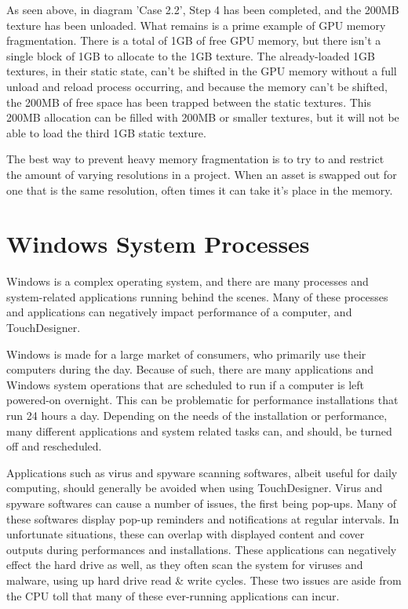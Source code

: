 \begin{fullwidth}
As seen above, in diagram 'Case 2.2', Step 4 has been completed, and the 200MB texture has been unloaded. What remains is a prime example of GPU memory fragmentation. There is a total of 1GB of free GPU memory, but there isn't a single block of 1GB to allocate to the 1GB texture. The already-loaded 1GB textures, in their static state, can't be shifted in the GPU memory without a full unload and reload process occurring, and because the memory can't be shifted, the 200MB of free space has been trapped between the static textures. This 200MB allocation can be filled with 200MB or smaller textures, but it will not be able to load the third 1GB static texture.

The best way to prevent heavy memory fragmentation is to try to and restrict the amount of varying resolutions in a project. When an asset is swapped out for one that is the same resolution, often times it can take it's place in the memory.

\end{fullwidth}


\section{Windows System Processes}

\begin{fullwidth}
Windows is a complex operating system, and there are many processes and system-related applications running behind the scenes. Many of these processes and applications can negatively impact performance of a computer, and TouchDesigner. 

Windows is made for a large market of consumers, who primarily use their computers during the day. Because of such, there are many applications and Windows system operations that are scheduled to run if a computer is left powered-on overnight. This can be problematic for performance installations that run 24 hours a day. Depending on the needs of the installation or performance, many different applications and system related tasks can, and should, be turned off and rescheduled.

Applications such as virus and spyware scanning softwares, albeit useful for daily computing, should generally be avoided when using TouchDesigner. Virus and spyware softwares can cause a number of issues, the first being pop-ups. Many of these softwares display pop-up reminders and notifications at regular intervals. In unfortunate situations, these can overlap with displayed content and cover outputs during performances and installations. These applications can negatively effect the hard drive as well, as they often scan the system for viruses and malware, using up hard drive read \& write cycles. These two issues are aside from the CPU toll that many of these ever-running applications can incur. 

\end{fullwidth}